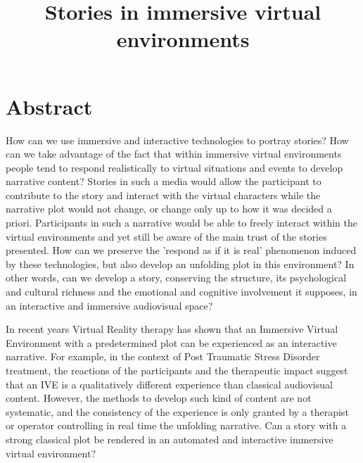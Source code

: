 \documentclass[11pt,a4paper,pdftex,headexclude,smallheadings,pointlessnumbers,bibtotoc,idxtotoc,twoside,authordate1-4]{report}
\begin{document}



\title{Stories in immersive virtual environments}

 



\chapter*{Abstract}


How can we use immersive and interactive technologies to portray stories? How can we take advantage of the fact that within immersive virtual environments people tend to respond realistically to virtual situations and events to develop narrative content? Stories in such a media would allow the participant to contribute to the story and interact with the virtual characters while the narrative plot would not change, or change only up to how it was decided a priori. Participants in such a narrative would be able to freely interact within the virtual environments and yet still be aware of the main trust of the stories presented. How can we  preserve the 'respond as if it is real' phenomenon induced by these technologies, but also develop an unfolding plot in this environment? In other words, can we develop a story, conserving the structure, its psychological and cultural richness and the emotional and cognitive involvement it supposes, in an interactive and immersive audiovisual space? 

In recent years Virtual Reality therapy has shown that an Immersive Virtual Environment with a predetermined plot can be experienced as an interactive narrative. For example, in the context of Post Traumatic Stress Disorder treatment, the reactions of the participants and the therapeutic impact suggest that an IVE is a qualitatively different experience than classical audiovisual content. However, the methods to develop such kind of content are not systematic, and the consistency of the experience is only granted by a therapist or operator controlling in real time the unfolding narrative. Can a story with a strong classical plot be rendered in an automated and interactive immersive virtual environment?
\end{document}
